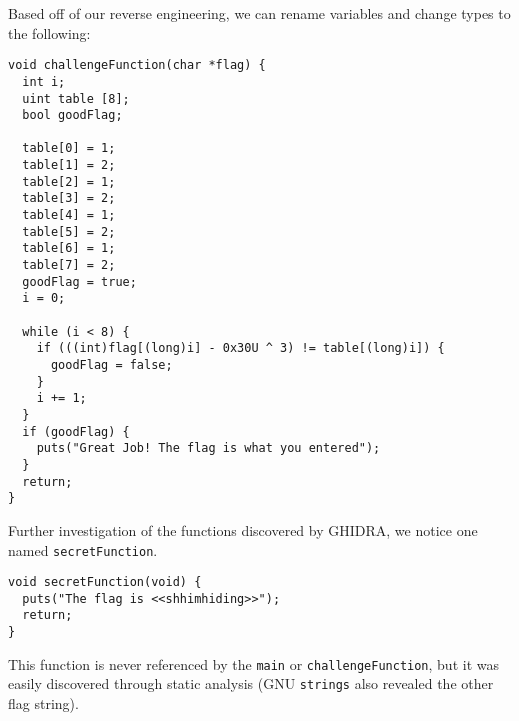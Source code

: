 Based off of our reverse engineering, we can rename variables and change types to the following:
\begin{lstlisting}
void challengeFunction(char *flag) {
  int i;
  uint table [8];
  bool goodFlag;
  
  table[0] = 1;
  table[1] = 2;
  table[2] = 1;
  table[3] = 2;
  table[4] = 1;
  table[5] = 2;
  table[6] = 1;
  table[7] = 2;
  goodFlag = true;
  i = 0;

  while (i < 8) {
    if (((int)flag[(long)i] - 0x30U ^ 3) != table[(long)i]) {
      goodFlag = false;
    }
    i += 1;
  }
  if (goodFlag) {
    puts("Great Job! The flag is what you entered");
  }
  return;
}
\end{lstlisting}

Further investigation of the functions discovered by GHIDRA, we notice one named \texttt{secretFunction}.

\begin{lstlisting}
void secretFunction(void) {
  puts("The flag is <<shhimhiding>>");
  return;
}
\end{lstlisting}

This function is never referenced by the \texttt{main} or \texttt{challengeFunction}, but it was easily discovered through static analysis (GNU \texttt{strings} also revealed the other flag string).
